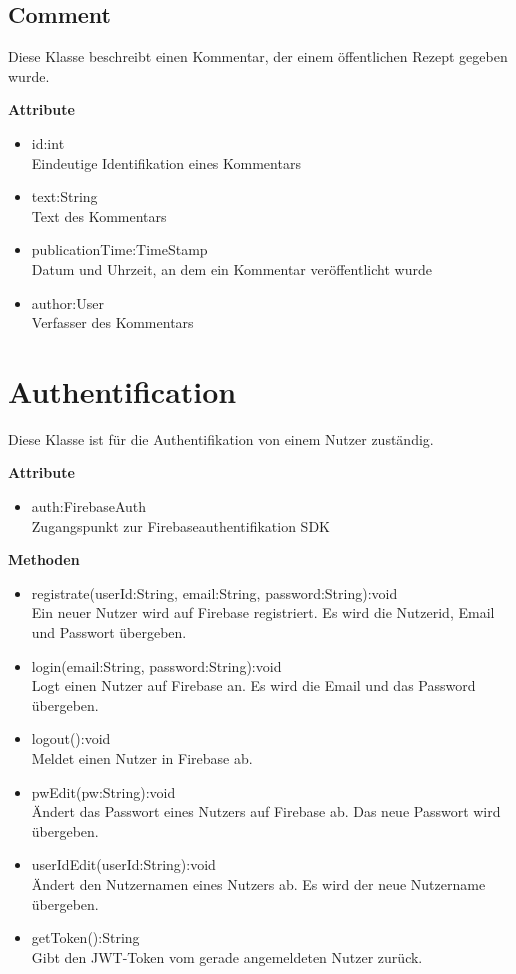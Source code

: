 \subsection{Comment}
Diese Klasse beschreibt einen Kommentar, der einem öffentlichen Rezept gegeben wurde.

\textbf{Attribute}
\begin{itemize}[nosep]
	\item id:int \\ Eindeutige Identifikation eines Kommentars
	\item text:String \\ Text des Kommentars
	\item publicationTime:TimeStamp \\ Datum und Uhrzeit, an dem ein Kommentar veröffentlicht wurde
	\item author:User \\ Verfasser des Kommentars
\end{itemize}

\section{Authentification}
Diese Klasse ist für die Authentifikation von einem Nutzer zuständig.

\textbf{Attribute}
\begin{itemize}[nosep]
	\item auth:FirebaseAuth \\Zugangspunkt zur Firebaseauthentifikation SDK
\end{itemize}
\textbf{Methoden}
\begin{itemize}[nosep]
	\item registrate(userId:String, email:String, password:String):void \\Ein neuer Nutzer wird auf Firebase registriert. Es wird die Nutzerid, Email und Passwort übergeben.
	\item login(email:String, password:String):void \\Logt einen Nutzer auf Firebase an. Es wird die Email und das Password übergeben.
	\item logout():void \\Meldet einen Nutzer in Firebase ab. 
	\item pwEdit(pw:String):void \\Ändert das Passwort eines Nutzers auf Firebase ab. Das neue Passwort wird übergeben.
	\item userIdEdit(userId:String):void \\Ändert den Nutzernamen eines Nutzers ab. Es wird der neue Nutzername übergeben.
	\item getToken():String \\Gibt den JWT-Token vom gerade angemeldeten Nutzer zurück.
\end{itemize}

